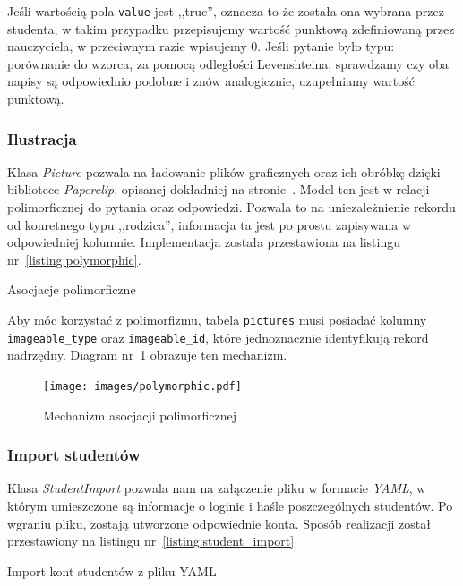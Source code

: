 \documentclass[a4paper,12pt]{article}
\begin{document}
Jeśli wartością pola \texttt{value} jest ,,true'', oznacza to że została ona wybrana przez studenta, w
takim przypadku przepisujemy wartość punktową zdefiniowaną przez nauczyciela, w przeciwnym
razie wpisujemy 0. Jeśli pytanie było typu: porównanie do wzorca, za pomocą odległości
Levenshteina, sprawdzamy czy oba napisy są odpowiednio podobne i znów analogicznie,
uzupełniamy wartość punktową.

\subsubsection{Ilustracja}
Klasa \emph{Picture} pozwala na ładowanie plików graficznych oraz ich obróbkę dzięki
bibliotece \emph{Paperclip}, opisanej dokładniej na stronie~\pageref{sec:paperclip}.
Model ten jest w relacji polimorficznej do pytania oraz odpowiedzi. Pozwala to na
uniezależnienie rekordu od konretnego typu ,,rodzica'', informacja ta jest po prostu
zapisywana w odpowiedniej kolumnie. Implementacja została przestawiona na listingu
nr~\ref{listing:polymorphic}.

\begin{listing}
  
  \caption{Asocjacje polimorficzne}
  \label{listing:polymorphic}
\end{listing}


Aby móc korzystać z polimorfizmu, tabela \texttt{pictures} musi posiadać kolumny
\texttt{imageable\_type} oraz \texttt{imageable\_id}, które jednoznacznie identyfikują
rekord nadrzędny. Diagram nr~\ref{fig:polymorphic} obrazuje ten mechanizm.

\begin{figure}[ht]
  \begin{center}
    \texttt{[image: images/polymorphic.pdf]}
  \end{center}
  \caption{Mechanizm asocjacji polimorficznej}
  \label{fig:polymorphic}
\end{figure}

\subsubsection{Import studentów}
Klasa \emph{StudentImport} pozwala nam na załączenie pliku w formacie \emph{YAML}, w
którym umieszczone są informacje o loginie i haśle poszczególnych studentów. Po wgraniu
pliku, zostają utworzone odpowiednie konta. Sposób realizacji został przestawiony na
listingu nr~\ref{listing:student_import}

\begin{listing}
  
  \caption{Import kont studentów z pliku YAML}
  \label{listing:student_import}
\end{listing}
\end{document}
